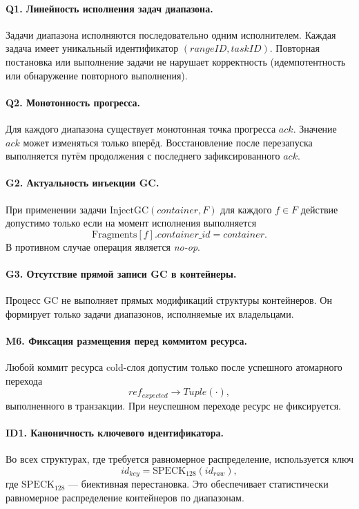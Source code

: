 \documentclass[a4paper,12pt]{article}
\begin{document}
\paragraph{Q1. Линейность исполнения задач диапазона.}
Задачи диапазона исполняются последовательно одним исполнителем.
Каждая задача имеет уникальный идентификатор $(rangeID, taskID)$.
Повторная постановка или выполнение задачи не нарушает корректность
(идемпотентность или обнаружение повторного выполнения).

\paragraph{Q2. Монотонность прогресса.}
Для каждого диапазона существует монотонная точка прогресса $ack$.
Значение $ack$ может изменяться только вперёд.
Восстановление после перезапуска выполняется путём продолжения
с последнего зафиксированного $ack$.

\paragraph{G2. Актуальность инъекции GC.}
При применении задачи $\mathrm{InjectGC}(container, F)$
для каждого $f \in F$ действие допустимо только если
на момент исполнения выполняется
\[
\mathrm{Fragments}[f].container\_id = container.
\]
В противном случае операция является \emph{no-op}.

\paragraph{G3. Отсутствие прямой записи GC в контейнеры.}
Процесс GC не выполняет прямых модификаций структуры контейнеров.
Он формирует только задачи диапазонов, исполняемые их владельцами.

\paragraph{M6. Фиксация размещения перед коммитом ресурса.}
Любой коммит ресурса cold-слоя допустим только после успешного
атомарного перехода
\[
ref_{expected} \rightarrow Tuple(\cdot),
\]
выполненного в транзакции.
При неуспешном переходе ресурс не фиксируется.

\paragraph{ID1. Каноничность ключевого идентификатора.}
Во всех структурах, где требуется равномерное распределение,
используется ключ
\[
id_{key} = \mathrm{SPECK}_{128}(id_{raw}),
\]
где $\mathrm{SPECK}_{128}$ — биективная перестановка.
Это обеспечивает статистически равномерное распределение
контейнеров по диапазонам.
\end{document}
